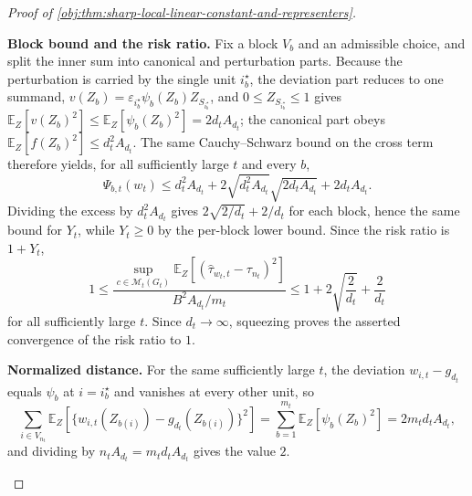 \documentclass[11pt]{article}
\begin{document}
\begin{proof}[Proof of \cref{obj:thm:sharp-local-linear-constant-and-representers}]
\begin{enumerate}
\textbf{Block bound and the risk ratio.}  Fix a block \(V_b\) and an admissible choice, and split the inner sum into canonical and perturbation parts.  Because the perturbation is carried by the single unit \(i_b^\star\), the deviation part reduces to one summand, \(v(Z_b)=\varepsilon_{i_b^\star}\psi_b(Z_b)Z_{S_{i_b^\star}}\), and \(0\le Z_{S_{i_b^\star}}\le1\) gives \(\mathbb E_Z[v(Z_b)^2]\le\mathbb E_Z[\psi_b(Z_b)^2]=2d_tA_{d_t}\); the canonical part obeys \(\mathbb E_Z[f(Z_b)^2]\le d_t^2A_{d_t}\).  The same Cauchy--Schwarz bound on the cross term therefore yields, for all sufficiently large \(t\) and every \(b\),
\[
\Psi_{b,t}(w_t)
\le
d_t^2A_{d_t}
+2\sqrt{d_t^2A_{d_t}}\sqrt{2d_tA_{d_t}}
+2d_tA_{d_t}.
\]
Dividing the excess by \(d_t^2A_{d_t}\) gives \(2\sqrt{2/d_t}+2/d_t\) for each block, hence the same bound for \(Y_t\), while \(Y_t\ge0\) by the per-block lower bound.  Since the risk ratio is \(1+Y_t\),
\[
1
\le
\frac{
\sup_{c\in\mathcal M_t(G_t)}\mathbb E_Z[(\widehat\tau_{w_t,t}-\tau_{n_t})^2]
}{
B^2A_{d_t}/m_t
}
\le
1+2\sqrt{\frac{2}{d_t}}+\frac{2}{d_t}
\]
for all sufficiently large \(t\).  Since \(d_t\to\infty\), squeezing proves the asserted convergence of the risk ratio to \(1\). %

\textbf{Normalized distance.}  For the same sufficiently large \(t\), the deviation \(w_{i,t}-g_{d_t}\) equals \(\psi_b\) at \(i=i_b^\star\) and vanishes at every other unit, so
\[
\sum_{i\in V_{n_t}}
\mathbb E_Z\!\left[\bigl\{w_{i,t}(Z_{b(i)})-g_{d_t}(Z_{b(i)})\bigr\}^2\right]
=
\sum_{b=1}^{m_t}\mathbb E_Z\!\left[\psi_b(Z_b)^2\right]
=
2m_td_tA_{d_t},
\]
and dividing by \(n_tA_{d_t}=m_td_tA_{d_t}\) gives the value \(2\). %


\end{enumerate}
\end{proof}
\end{document}

